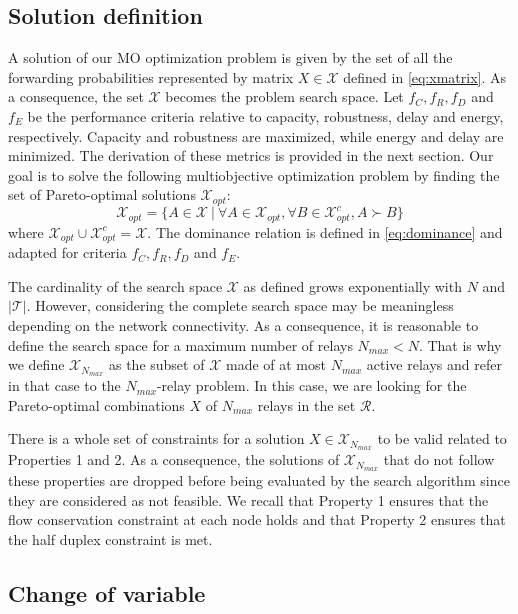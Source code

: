 \documentclass[a4paper]{article}
\newcommand{\T}{\mathcal{T}}
\newcommand{\X}{\mathcal{X}}
\newcommand{\R}{\mathcal{R}}
\begin{document}
\subsection{Solution definition}
A solution of our MO optimization problem is given by the set of all the forwarding probabilities represented by matrix $X \in \X$ defined in \eqref{eq:xmatrix}. As a consequence, the set $\X$ becomes the problem search space. 
Let  $f_C, f_R, f_D$ and $f_E$ be the performance criteria relative to capacity, robustness, delay and energy, respectively. Capacity and robustness are maximized, while energy and delay are minimized. The derivation of these metrics is provided in the next section. 
Our goal is to solve the following multiobjective optimization problem by finding the set of Pareto-optimal solutions $\X_{opt}$:
\begin{equation}
\X_{opt} = \{A \in \X~| ~\forall A \in \X_{opt}, \forall B \in \X_{opt}^{c},  A \succ B \}
\label{eq:MOproblem}
\end{equation}
\noindent where $  \X_{opt} \cup \X_{opt}^{c} = \X$. The dominance relation is defined in \eqref{eq:dominance} and adapted for criteria $f_C, f_R, f_D$ and $f_E$.

The cardinality of the search space $\X$ as defined grows exponentially with $N$ and $|\T|$. However, considering the complete search space may be meaningless depending on the network connectivity.  
As a consequence, it is reasonable to define the search space for a maximum number of relays $N_{max}<N$.     
That is why we define $\X_{N_{max}}$ as the subset of $\X$ made of at most $N_{max}$ active relays and refer in that case to the $N_{max}$-relay problem. In this case, we are looking for the Pareto-optimal combinations $X$ of $N_{max}$ relays in the set $\R$.  

There is a whole set of constraints for a solution $X \in  \X_{N_{max}}$ to be valid related to Properties 1 and 2. As a consequence, the solutions of   $\X_{N_{max}}$ that do not follow these properties are dropped before being evaluated by the search algorithm since they are considered as not feasible. We recall that Property 1 ensures that the flow conservation constraint at each node holds and that Property 2 ensures that the half duplex constraint is met.  

\subsection{Change of variable}
\end{document}
